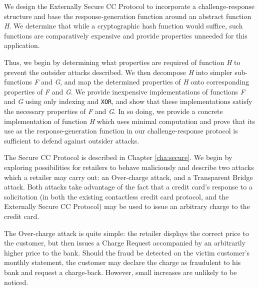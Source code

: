 We design the Externally Secure CC Protocol to incorporate a challenge-response structure and base the response-generation function around an abstract function \emph{H}.
We determine that while a cryptographic hash function would suffice, such functions are comparatively expensive and provide properties unneeded for this application.

Thus, we begin by determining what properties are required of function \emph{H} to prevent the outsider attacks described.
We then decompose \emph{H} into simpler sub-functions \emph{F} and \emph{G}, and map the determined properties of \emph{H} onto corresponding properties of \emph{F} and \emph{G}.
We provide inexpensive implementations of functions \emph{F} and \emph{G} using only indexing and \texttt{XOR},
    and show that these implementations satisfy the necessary properties of \emph{F} and \emph{G}.
In so doing, we provide a concrete implementation of function \emph{H} which uses minimal computation
    and prove that its use as the response-generation function in our challenge-response protocol is sufficient to defend against outsider attacks.


The Secure CC Protocol is described in Chapter \ref{cha:secure}.
We begin by exploring possibilities for retailers to behave maliciously and describe two attacks which a retailer may carry out:
    an Over-charge attack, and a Transparent Bridge attack.
Both attacks take advantage of the fact that a credit card's response to a solicitation
    (in both the existing contactless credit card protocol, and the Externally Secure CC Protocol)
    may be used to issue an arbitrary charge to the credit card.

The Over-charge attack is quite simple:
    the retailer displays the correct price to the customer, but then issues a Charge Request accompanied by an arbitrarily higher price to the bank.
Should the fraud be detected on the victim customer's monthly statement, the customer may declare the charge as fraudulent to his bank and request a charge-back.
However, small increases are unlikely to be noticed.

